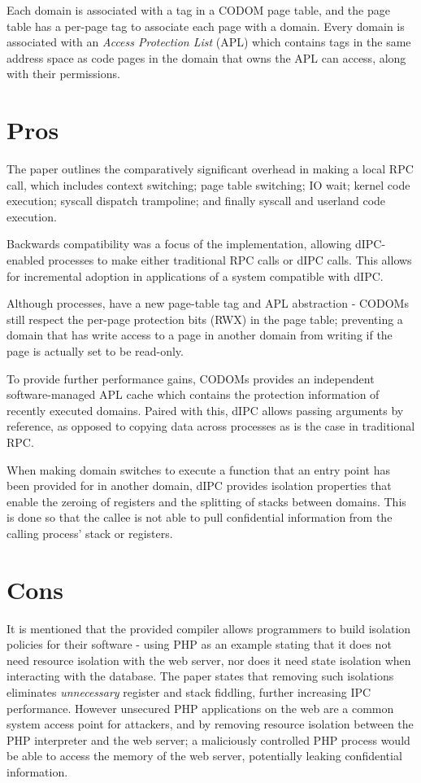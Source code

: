 \documentclass{article}
\begin{document}
Each domain is associated with a tag in a CODOM page table, and the page table has a per-page tag to associate each page with a domain. Every domain is  associated with an \textit{Access Protection List} (APL) which contains tags in the same address space as code pages in the domain that owns the APL can access, along with their permissions.

\section*{Pros}
The paper outlines the comparatively significant overhead in making a local RPC call, which includes context switching; page table switching; IO wait; kernel code execution; syscall dispatch trampoline; and finally syscall and userland code execution.

Backwards compatibility was a focus of the implementation, allowing dIPC-enabled processes to make either traditional RPC calls or dIPC calls. This allows for incremental adoption in applications of a system compatible with dIPC.

Although processes, have a new page-table tag and APL abstraction - CODOMs still respect the per-page protection bits (RWX) in the page table; preventing a domain that has write access to a page in another domain from writing if the page is actually set to be read-only.

To provide further performance gains, CODOMs provides an independent software-managed APL cache which contains the protection information of recently executed domains. Paired with this, dIPC allows passing arguments by reference, as opposed to copying data across processes as is the case in traditional RPC.

When making domain switches to execute a function that an entry point has been provided for in another domain, dIPC provides isolation properties that enable the zeroing of registers and the splitting of stacks between domains. This is done so that the callee is not able to pull confidential information from the calling process' stack or registers.


\section*{Cons}
It is mentioned that the provided compiler allows programmers to build isolation policies for their software - using PHP as an example stating that it does not need resource isolation with the web server, nor does it need state isolation when interacting with the database. The paper states that removing such isolations eliminates \textit{unnecessary} register and stack fiddling, further increasing IPC performance. However unsecured PHP applications on the web are a common system access point for attackers, and by removing resource isolation between the PHP interpreter and the web server; a maliciously controlled PHP process would be able to access the memory of the web server, potentially leaking confidential information.
\end{document}
